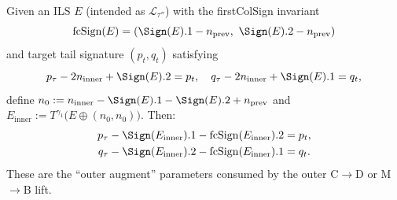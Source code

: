 \begin{lemma}
  \label{lem:11_5_D_ILS}
  \leanok
  Given an ILS $E$ (intended as $\mathcal{L}_{\tau''}$) with the firstColSign
  invariant
  \[ \mathrm{fcSign}(E) = (\Sign(E).1 - n_{\mathrm{prev}},\ \Sign(E).2 - n_{\mathrm{prev}}) \]
  and target tail signature $(p_t, q_t)$ satisfying
  \[ p_\tau - 2 n_{\mathrm{inner}} + \Sign(E).2 = p_t,\quad q_\tau - 2 n_{\mathrm{inner}} + \Sign(E).1 = q_t, \]
  define $n_0 := n_{\mathrm{inner}} - \Sign(E).1 - \Sign(E).2 + n_{\mathrm{prev}}$ and
  $E_{\mathrm{inner}} := T^{\gamma_1}\big(E \oplus (n_0, n_0)\big)$. Then:
  \begin{align*}
    p_\tau - \Sign(E_{\mathrm{inner}}).1 - \mathrm{fcSign}(E_{\mathrm{inner}}).2 &= p_t, \\
    q_\tau - \Sign(E_{\mathrm{inner}}).2 - \mathrm{fcSign}(E_{\mathrm{inner}}).1 &= q_t.
  \end{align*}
  These are the ``outer augment'' parameters consumed by the outer C$\to$D or M$\to$B lift.
\end{lemma}

